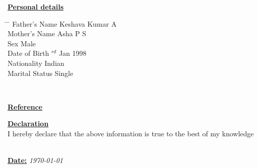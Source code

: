 \documentclass[10pt]{article}
\begin{document}
			
			\hfill
			
				\underline{\textbf{\Large{Personal details}}}
				
				\parbox{1.5\textwidth}{ %
					\begin{tabbing} %
						\hspace{3cm} \= \hspace{4cm} \= \kill %
						{ Father's Name} \> Keshava Kumar A\\
						{ Mother's Name} \> Asha P S\\
						{ Sex} \> Male\\
						{ Date of Birth} $^{rd}$ Jan 1998  \\ 
						{ Nationality} \> Indian \\
						{ Marital Status} \> Single\\
				\end{tabbing}}
				\\
				\hfill
				
				\underline{\textbf{\Large{Reference}}} \\
				\hfill
				
					\underline{\textbf{\Large{Declaration}}} \\
					
					I hereby declare that the above information is true to the best of
					my knowledge
					
					\hfill\\
					
					\underline{\textbf{\large{Date:}}}  {\em\today}
	
\end{document}
